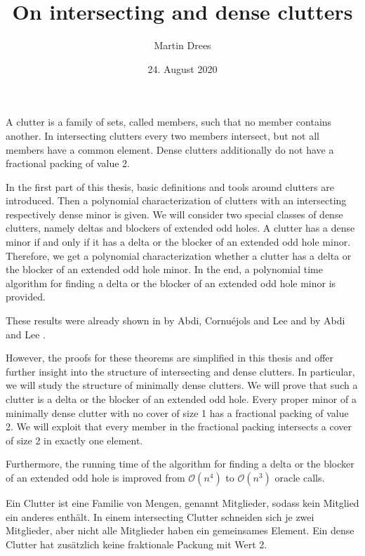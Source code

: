 \documentclass[a4paper, 12pt]{scrbook}
\author{Martin Drees}
\date{24. August 2020}
\title{On intersecting and dense clutters}
\theoremstyle{definition}
\begin{document}
\hypersetup{pageanchor=false}
\maketitle
\hypersetup{pageanchor=true}
A clutter is a family of sets, called members, such that no member contains another.
In intersecting clutters every two members intersect, but not all members have a common element. Dense clutters additionally do not have a fractional packing of value 2.

In the first part of this thesis, basic definitions and tools around clutters are introduced.
Then a polynomial characterization of clutters with an intersecting respectively dense minor is given.
We will consider two special classes of dense clutters, namely deltas and blockers of extended odd holes.
A clutter has a dense minor if and only if it has a delta or the blocker of an extended odd hole minor.
Therefore, we get a polynomial characterization whether a clutter has a delta or the blocker of an extended odd hole minor.
In the end, a polynomial time algorithm for finding a delta or the blocker of an extended odd hole minor is provided.

These results were already shown in  by Abdi, Cornuéjols and Lee \cite{restrictions} and  by Abdi and Lee \cite{deltas}.

However, the proofs for these theorems are simplified in this thesis and offer further insight into the structure of intersecting and dense clutters.
In particular, we will study the structure of minimally dense clutters.
We will prove that such a clutter is a delta or the blocker of an extended odd hole.
Every proper minor of a minimally dense clutter with no cover of size 1 has a fractional packing of value 2.
We will exploit that every member in the fractional packing intersects a cover of size 2 in exactly one element.

Furthermore, the running time of the algorithm for finding a delta or the blocker of an extended odd hole is improved from $\mathcal{O}(n^4)$ to $\mathcal{O}(n^3)$ oracle calls.

Ein Clutter ist eine Familie von Mengen, genannt Mitglieder, sodass kein Mitglied ein anderes enthält. In einem intersecting Clutter schneiden sich je zwei Mitglieder, aber nicht alle Mitglieder haben ein gemeinsames Element.
Ein dense Clutter hat zusätzlich keine fraktionale Packung mit Wert 2.
\end{document}
